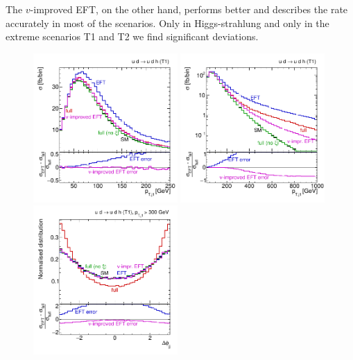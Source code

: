 The $v$-improved EFT, on the other hand, performs better and describes
the rate accurately in most of the scenarios. Only in Higgs-strahlung
and only in the extreme scenarios T1 and T2 we find significant
deviations. 

\begin{figure}
  \includegraphics[width=0.49\textwidth,clip=true,trim=0 0.2cm 0 0.2cm]{fig/validity/Triplet_WBF.pdf}%
  \includegraphics[width=0.49\textwidth,clip=true,trim=0 0.2cm 0 0.2cm]{fig/validity/Triplet_WBF_log.pdf}\\%
  \includegraphics[width=0.49\textwidth,clip=true,trim=0 0.2cm 0 0.2cm]{fig/validity/Triplet_WBF_deltaphi.pdf}%

\end{figure}
